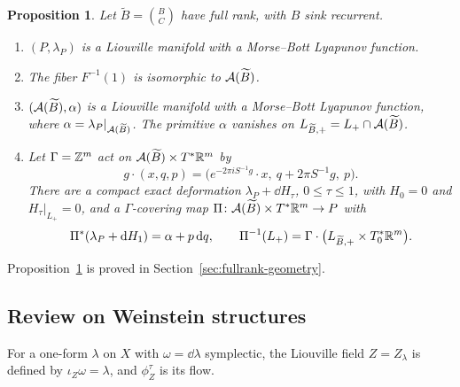 \documentclass[12pt, letter]{amsart}
\newtheorem{proposition}[dummy]{Proposition}
\theoremstyle{definition}
\begin{document}
\begin{proposition}\label{prop:fullrank-geometry}
Let $\widetilde B=\binom BC$ have full rank, with $B$ sink recurrent.
\begin{enumerate}[label=\textup{(Q\arabic*)}]
\item\label{Q1} $(P,\lambda_P)$ is a Liouville manifold with a Morse--Bott Lyapunov function.
\item\label{Q2} The fiber $F^{-1}(1)$ is isomorphic to $\mathcal{A}(\widetilde B)$.
\item\label{Q3} $(\mathcal{A}(\widetilde B),\alpha)$ is a Liouville manifold with a Morse--Bott Lyapunov function, where $\alpha=\lambda_P|_{\mathcal{A}(\widetilde B)}$.
The primitive $\alpha$ vanishes on $L_{\widetilde B,+}=L_+\cap \mathcal{A}(\widetilde B)$.

\item\label{Q4} Let $\Gamma=\mathbb{Z}^m$ act on $\mathcal{A}(\widetilde B)\times T^*\mathbb{R}^m$ by
\[
 g\cdot(x,q,p)=\bigl(e^{-2\pi iS^{-1}g}\cdot x,\ q+2\pi S^{-1}g,\ p\bigr).
\]
There are a compact exact deformation $\lambda_P+\dd H_\tau$, $0\le\tau\le1$, with $H_0=0$ and $H_\tau|_{L_+}=0$, and a $\Gamma$-covering map $\Pi\colon\mathcal{A}(\widetilde B)\times T^*\mathbb{R}^m\to P$ with
\[
 \Pi^*(\lambda_P+\mathrm{d} H_1)=\alpha+p\,\mathrm{d} q,\qquad
 \Pi^{-1}(L_+)=\Gamma\cdot\bigl(L_{\widetilde B,+}\times T^*_0\mathbb{R}^m\bigr).
\]
\end{enumerate}
\end{proposition}

Proposition~\ref{prop:fullrank-geometry} is proved in Section~\ref{sec:fullrank-geometry}.

\subsection{Review on Weinstein structures}\label{app:Morse-Bott}


For a one-form $\lambda$ on $X$ with $\omega=\dd\lambda$ symplectic, the Liouville field $Z=Z_\lambda$ is defined by $\iota_Z\omega=\lambda$, and $\phi_Z^\tau$ is its flow. 
\end{document}
